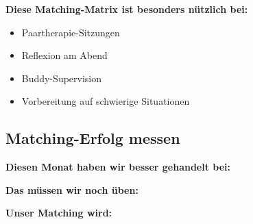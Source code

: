 \begin{tcolorbox}[colback=ctmmPurple!5!white,colframe=ctmmPurple,title=Verwendung]
[EMOJI] \textbf{Diese Matching-Matrix ist besonders nützlich bei:}
\begin{itemize}
  \item Paartherapie-Sitzungen
  \item Reflexion am Abend
  \item Buddy-Supervision
  \item Vorbereitung auf schwierige Situationen
\end{itemize}
\end{tcolorbox}

\subsection*{\textcolor{ctmmOrange}{Matching-Erfolg messen}}

\textbf{Diesen Monat haben wir besser gehandelt bei:}\\

\textbf{Das müssen wir noch üben:}\\

\textbf{Unser Matching wird:}   
